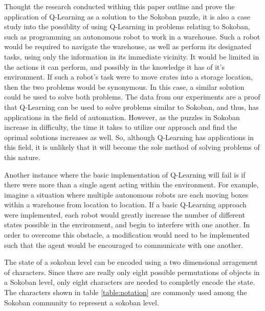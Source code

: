 \documentclass[times, 10pt,twocolumn]{article}
\begin{document}


Thought the research conducted withing this paper outline and prove the application of Q-Learning as a solution to the Sokoban puzzle, it is also a case study into the possiblity of using Q-Learning in problems relating to Sokoban, such as programming an autonomous robot to work in a warehouse. Such a robot would be required to navigate the warehouse, as well as perform its designated tasks, using only the information in its immediate vicinity.  It would be limited in the actions it can perform, and possibly in the knowledge it has of it's environment. If such a robot’s task were to move crates into a storage location, then the two problems would be synonymous. In this case, a similar solution could be used to solve both problems. The data from our experiments are a proof that Q-Learning can be used to solve problems similar to Sokoban, and thus, has applications in the field of automation.  However, as the puzzles in Sokoban increase in difficulty, the time it takes to utilize our approach and find the oprimal solutions increases as well.  So, although Q-Learning has applications in this field, it is unlikely that it will become the sole method of solving problems of this nature.

Another instance where the basic implementation of Q-Learning will fail is if there were more than a single agent acting within the environment. For example, imagine a situation where multiple autonomous robots are each moving boxes within a warehouse from location to location. If a basic Q-Learning approach were implemented, each robot would greatly increase the number of different states possible in the environment, and begin to interfere with one another.  In order to overcome this obstacle, a modification would need to be implemented such that the agent would be encouraged to communicate with one another.


The state of a sokoban level can be encoded using a two dimensional arragement of characters. Since there are really only eight possible permutations of objects in a Sokoban level, only eight characters are needed to completly encode the state. The characters shown in table \ref{table:notation} are commonly used among the Sokoban community to represent a sokoban level.
\end{document}
